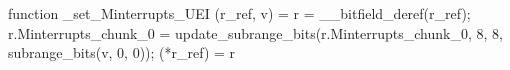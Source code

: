 function _set_Minterrupts_UEI (r_ref, v) = {
    r = __bitfield_deref(r_ref);
    r.Minterrupts_chunk_0 = update_subrange_bits(r.Minterrupts_chunk_0, 8, 8, subrange_bits(v, 0, 0));
    (*r_ref) = r
}
